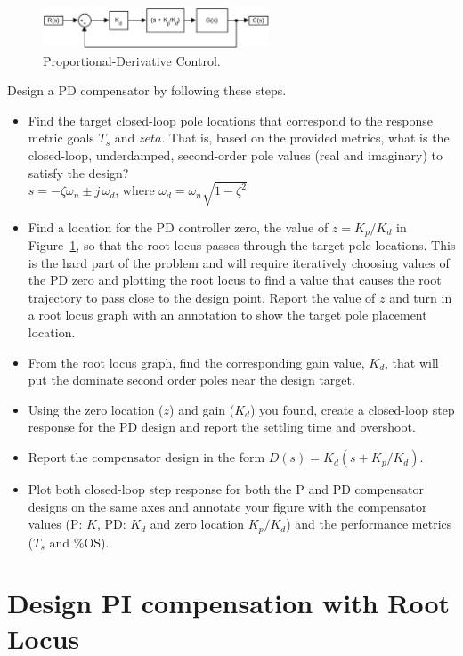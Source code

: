 \documentclass[11pt]{article}
\begin{document}
\begin{figure}[hbt!]
\centering  
\includegraphics [width=0.6\textwidth]{pd_control.png}
\caption{Proportional-Derivative Control.}
\label{f:pd}
\end{figure}

Design a PD compensator by following these steps.
\begin{itemize}
\item Find the target closed-loop pole locations that correspond to the response metric goals $T_s$ and $zeta$.  That is, based on the provided metrics, what is the closed-loop, underdamped, second-order pole values (real and imaginary) to satisfy the design?  \\
  $s = -\zeta \omega_n \pm j \,\omega_d$, where $\omega_d = \omega_n \sqrt{1-\zeta^2}$
\item Find a location for the PD controller zero, the value of $z = K_p/K_d$ in Figure~\ref{f:pd}, so that the root locus passes through the target pole locations.  This is the hard part of the problem and will require iteratively choosing values of the PD zero and plotting the root locus to find a value that causes the root trajectory to pass close to the design point.  Report the value of $z$ and turn in a root locus graph with an annotation to show the target pole placement location.
\item From the root locus graph, find the corresponding gain value, $K_d$, that will put the dominate second order poles near the design target.  
\item Using the zero location ($z$) and gain ($K_d$) you found, create a closed-loop step response for the PD design and report the settling time and overshoot.
\item Report the compensator design in the form $D(s) = K_d (s + K_p/K_d)$.
  \item Plot both closed-loop step response for both the P and PD compensator designs on the same axes and annotate your figure with the compensator values (P: $K$, PD: $K_d$ and zero location $K_p/K_d$) and the performance metrics ($T_s$ and \%OS).
\end{itemize}



\section{Design PI compensation with Root Locus}
\end{document}
